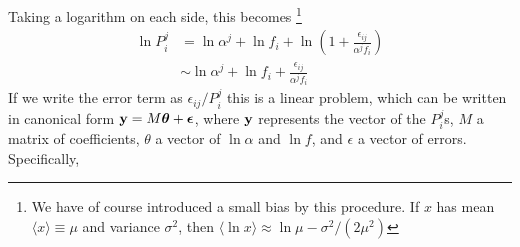 \documentclass[12pt]{article}
\begin{document}
Taking a logarithm on each side, this becomes
\footnote{We have of course introduced a small bias by this procedure.
If $x$ has mean $\langle{x}\rangle \equiv \mu$ and variance $\sigma^2$, then
$\langle{\ln{x}}\rangle \approx \ln\mu - \sigma^2/(2\mu^2)$}
\begin{align*}
\ln P_i^j &= \ln\alpha^j + \ln f_i +
		\ln\left(1 + \frac{\epsilon_{ij}}{\alpha^j f_i}\right)\\
          &\sim \ln\alpha^j + \ln f_i +
		\frac{\epsilon_{ij}}{\alpha^j f_i}
\end{align*}
If we write the error term as $\epsilon_{ij}/P_i^j$ this is a
linear problem, which can be written in canonical form
${\bf y} = M \mbox{\boldmath $\theta$} + \mbox{\boldmath $\epsilon$}$,
where ${\bf y}$ represents the vector of the $P_i^j$s,
$M$ a matrix of coefficients,
{\boldmath $\theta$} a vector of $\ln\alpha$ and $\ln f$,
and {\boldmath $\epsilon$} a vector of errors. Specifically,
\end{document}

